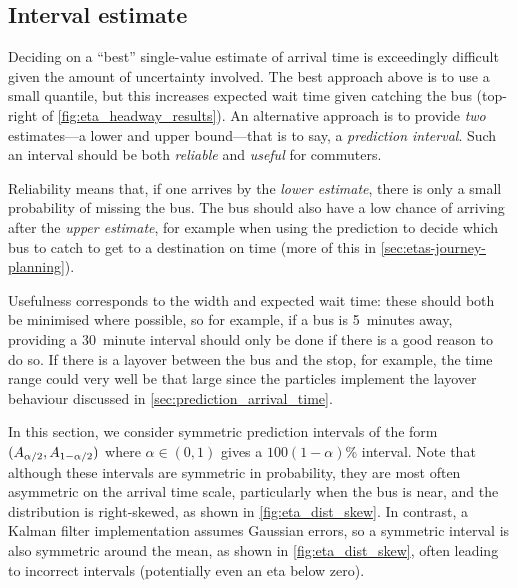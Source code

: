 \subsection{Interval estimate}
\label{sec:etas-interval}


Deciding on a ``best'' single-value estimate of arrival time is exceedingly difficult given the amount of uncertainty involved. The best approach above is to use a small quantile, but this increases expected wait time given catching the bus (top-right of \cref{fig:eta_headway_results}). An alternative approach is to provide \emph{two} estimates---a lower and upper bound---that is to say, a \emph{prediction interval}. Such an interval should be both \emph{reliable} and \emph{useful} for commuters.

Reliability means that, if one arrives by the \emph{lower estimate}, there is only a small probability of missing the bus. The bus should also have a low chance of arriving after the \emph{upper estimate}, for example when using the prediction to decide which bus to catch to get to a destination on time (more of this in \cref{sec:etas-journey-planning}).

Usefulness corresponds to the width and expected wait time: these should both be minimised where possible, so for example, if a bus is 5~minutes away, providing a 30~minute interval should only be done if there is a good reason to do so. If there is a layover between the bus and the stop, for example, the time range could very well be that large since the particles implement the layover behaviour discussed in \cref{sec:prediction_arrival_time}.







In this section, we consider symmetric prediction intervals of the form $(A_{\alpha/2}, A_{1-\alpha/2})$ where $\alpha \in (0,1)$ gives a $100(1-\alpha)$\% interval. Note that although these intervals are symmetric in probability, they are most often asymmetric on the arrival time scale, particularly when the bus is near, and the distribution is right-skewed, as shown in \cref{fig:eta_dist_skew}. In contrast, a Kalman filter implementation assumes Gaussian errors, so a symmetric interval is also symmetric around the mean, as shown in \cref{fig:eta_dist_skew}, often leading to incorrect intervals (potentially even an \gls{eta} below zero).


